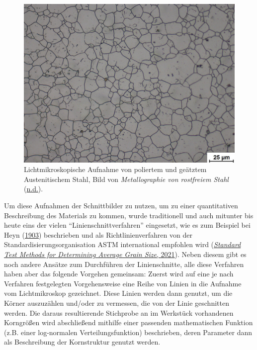 \documentclass[
  12pt,
  openany]{book}
\begin{document}
\begin{figure}

{\centering \includegraphics[width=.8\textwidth]{../imgs/fig5} 

}

\caption[Lichtmikroskopische Aufnahme von Austenitischem Stahl.]{Lichtmikroskopische Aufnahme von poliertem und geätztem Austenitischem Stahl, Bild von \emph{Metallographie von rostfreiem Stahl} (\protect\hyperlink{ref-MetallographieRostfreiemStahl}{n.d.}).}\label{fig:baseGrain}
\end{figure}

Um diese Aufnahmen der Schnittbilder zu nutzen, um zu einer quantitativen Beschreibung des Materials zu kommen, wurde traditionell und auch mitunter bis heute eins der vielen ``Linienschnittverfahren'' eingesetzt, wie es zum Beispiel bei Heyn (\protect\hyperlink{ref-heynShortReportsMetallurgical1903}{1903}) beschrieben und als Richtlinienverfahren von der Standardisierungsorganisation ASTM international empfohlen wird (\protect\hyperlink{ref-StandardTestMethods2021}{\emph{Standard {Test Methods} for {Determining Average Grain Size}}, 2021}).
Neben diesem gibt es noch andere Ansätze zum Durchführen der Linienschnitte, alle diese Verfahren haben aber das folgende Vorgehen gemeinsam:
Zuerst wird auf eine je nach Verfahren festgelegten Vorgehensweise eine Reihe von Linien in die Aufnahme vom Lichtmikroskop gezeichnet. Diese Linien werden dann genutzt, um die Körner auszuzählen und/oder zu vermessen, die von der Linie geschnitten werden.
Die daraus resultierende Stichprobe an im Werkstück vorhandenen Korngrößen wird abschließend mithilfe einer passenden mathematischen Funktion (z.B. einer log-normalen Verteilungsfunktion) beschrieben, deren Parameter dann als Beschreibung der Kornstruktur genutzt werden.
\end{document}
